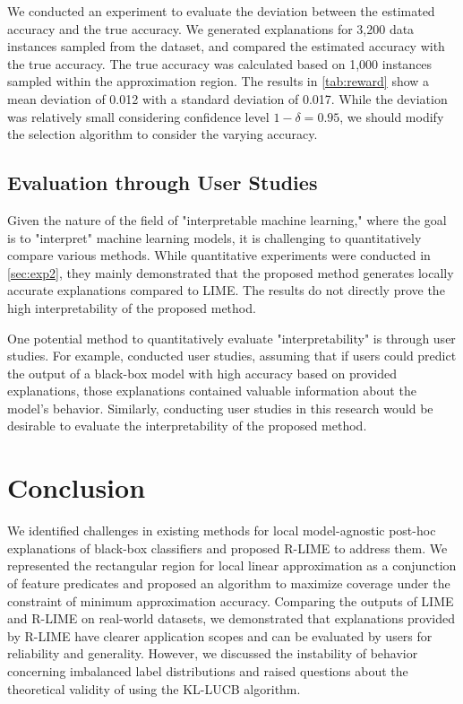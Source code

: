 \documentclass[runningheads]{llncs}
\begin{document}
We conducted an experiment to evaluate the deviation
between the estimated accuracy and the true accuracy.
We generated explanations for 3,200 data instances sampled from the dataset,
and compared the estimated accuracy with the true accuracy.
The true accuracy was calculated based on 1,000 instances sampled
within the approximation region.
The results in \cref{tab:reward} show a mean deviation of 0.012
with a standard deviation of 0.017.
While the deviation was relatively small considering confidence level $1-\delta=0.95$,
we should modify the selection algorithm to consider the varying accuracy.

\subsection{Evaluation through User Studies}
Given the nature of the field of "interpretable machine learning,"
where the goal is to "interpret" machine learning models,
it is challenging to quantitatively compare various methods.
While quantitative experiments were conducted in \cref{sec:exp2},
they mainly demonstrated that the proposed method generates
locally accurate explanations compared to LIME.
The results do not directly prove the high interpretability of the proposed method.

One potential method to quantitatively evaluate "interpretability" is
through user studies.
For example, \cite{ribeiro2018anchors} conducted user studies,
assuming that if users could predict the output of a black-box model
with high accuracy based on provided explanations,
those explanations contained valuable information about the model's behavior.
Similarly,
conducting user studies in this research would be desirable
to evaluate the interpretability of the proposed method.

\section{Conclusion}
We identified challenges in existing methods for local model-agnostic post-hoc
explanations of black-box classifiers and proposed R-LIME to address them.
We represented the rectangular region for local linear approximation as a
conjunction of feature predicates and proposed an algorithm to
maximize coverage under the constraint of minimum approximation accuracy.
Comparing the outputs of LIME and R-LIME on real-world datasets,
we demonstrated that explanations provided by R-LIME have clearer application
scopes and can be evaluated by users for reliability and generality.
However, we discussed the instability of behavior concerning imbalanced label
distributions and raised questions about the theoretical validity of using
the KL-LUCB algorithm.
\end{document}
